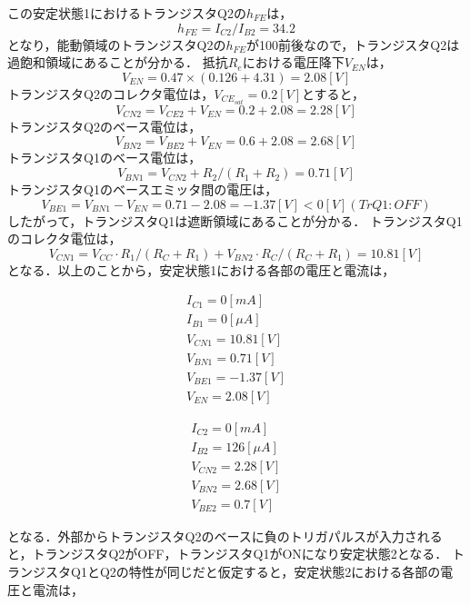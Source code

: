 \documentclass[10pt, a4j, dvipdfmx]{jarticle}
\begin{document}
    この安定状態1におけるトランジスタQ2の$h_{FE}$は，
    \[
        h_{FE} = I_{C2} / I_{B2} = 34.2
    \]
    となり，能動領域のトランジスタQ2の$h_{FE}$が100前後なので，トランジスタQ2は過飽和領域にあることが分かる．
    抵抗$R_e$における電圧降下$V_{EN}$は，
    \[
        V_{EN} = 0.47 \times (0.126 + 4.31) = 2.08 [V]
    \]
    トランジスタQ2のコレクタ電位は，$V_{CE_{sat}} = 0.2 [V]$とすると，
    \[
        V_{CN2} = V_{CE2} + V_{EN} = 0.2 + 2.08 = 2.28 [V]
    \]
    トランジスタQ2のベース電位は，
    \[
        V_{BN2} = V_{BE2} + V_{EN} = 0.6 + 2.08 = 2.68 [V]
    \]
    トランジスタQ1のベース電位は，
    \[
        V_{BN1} = V_{CN2} + R_2 / (R_1 + R_2) = 0.71 [V]
    \]
    トランジスタQ1のベースエミッタ間の電圧は，
    \[
        V_{BE1} = V_{BN1} - V_{EN} = 0.71 - 2.08 = -1.37 [V] < 0 [V] (Tr Q1 : OFF)
    \]
    したがって，トランジスタQ1は遮断領域にあることが分かる．
    トランジスタQ1のコレクタ電位は，
    \[
        V_{CN1} = V_{CC} \cdot R_1 / (R_C + R_1) + V_{BN2} \cdot R_C / (R_C + R_1) = 10.81 [V]
    \]
    となる．以上のことから，安定状態1における各部の電圧と電流は，

    \begin{minipage}{0.5\hsize}
        \begin{eqnarray}
            I_{C1} = 0 [mA] \nonumber \\
            I_{B1} = 0 [\mu A] \nonumber \\
            V_{CN1} = 10.81 [V] \nonumber \\
            V_{BN1} = 0.71 [V] \nonumber \\
            V_{BE1} = -1.37 [V] \nonumber \\
            V_{EN} = 2.08 [V] \nonumber
        \end{eqnarray}
    \end{minipage}
    \begin{minipage}{0.5\hsize}
        \begin{eqnarray}
            I_{C2} = 0 [mA] \nonumber \\
            I_{B2} = 126 [\mu A] \nonumber \\
            V_{CN2} = 2.28 [V] \nonumber \\
            V_{BN2} = 2.68 [V] \nonumber \\
            V_{BE2} = 0.7 [V] \nonumber
        \end{eqnarray}
    \end{minipage}

    となる．外部からトランジスタQ2のベースに負のトリガパルスが入力されると，トランジスタQ2がOFF，トランジスタQ1がONになり安定状態2となる．
    トランジスタQ1とQ2の特性が同じだと仮定すると，安定状態2における各部の電圧と電流は，
\end{document}
